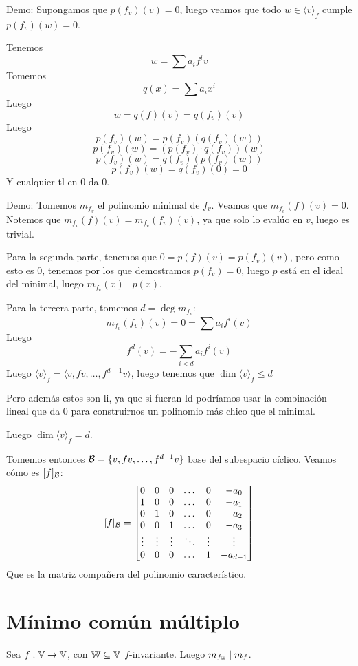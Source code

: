 \documentclass{article}
\begin{document}
Demo:
Supongamos que $p(f_v)(v) = 0$, luego veamos que todo $w \in \langle v \rangle_f$ cumple $p(f_v)(w) = 0$.

Tenemos
\[w = \sum a_i f^iv\]
Tomemos \[q(x) = \sum a_i x^i\]
Luego
\[
	w = q(f)(v) = q(f_v)(v)
\]
Luego
\[
	p(f_v)(w) = p(f_v)(q(f_v)(w))
\]
\[
	p(f_v)(w) = (p(f_v) \cdot q(f_v))(w)
\]
\[
	p(f_v)(w) = q(f_v)(p(f_v)(w))
\]
\[
	p(f_v)(w) = q(f_v)(0) = 0
\]
Y cualquier tl en $0$ da $0$.

Demo:
Tomemos $m_{f_v}$ el polinomio minimal de $f_v$. Veamos que $m_{f_v}(f)(v) = 0$. Notemos que $m_{f_v}(f)(v) = m_{f_v}(f_v)(v)$, ya que solo lo evalúo en $v$, luego es trivial.

Para la segunda parte, tenemos que $0 = p(f)(v) = p(f_v)(v)$, pero como esto es $0$, tenemos por los que demostramos $p(f_v) = 0$, luego $p$ está en el ideal del minimal, luego $m_{f_v}(x) \mid p(x)$.

Para la tercera parte, tomemos $d = \deg m_{f_v}$:
\[
	m_{f_v}(f_v)(v) = 0 = \sum a_if^i(v)
\]
Luego
\[
	f^d(v) = -\sum_{i < d} a_if^i(v)
\]
Luego $\langle v \rangle_f = \langle v, fv, \dots, f^{d-1}v \rangle$, luego tenemos que $\dim \langle v \rangle_f \leq d$

Pero además estos son li, ya que si fueran ld podríamos usar la combinación lineal que da $0$ para construirnos un polinomio más chico que el minimal.

Luego $\dim \langle v \rangle_f = d$.

Tomemos entonces $\mathcal{B} = \{v, fv, \dots, f^{d-1}v \}$ base del subespacio cíclico. Veamos cómo es $[f]_{\mathcal{B}}$:
\[
	[f]_{\mathcal{B}} = \begin{bmatrix}
		0 & 0 & 0&\dots & 0&-a_0 \\
		1 & 0 & 0&\dots & 0&-a_1 \\
		0 & 1 & 0&\dots & 0&-a_2 \\
		0 & 0 & 1&\dots & 0&-a_3 \\
		\vdots &
		\vdots &
		\vdots &
		\ddots &
		\vdots &
		\vdots \\
		0 & 0 & 0&\dots & 1&-a_{d-1} \\
	\end{bmatrix}
\]
Que es la matriz compañera del polinomio característico.

\section*{Mínimo común múltiplo}
Sea $f : \mathbb{V} \to \mathbb{V}$, con $\mathbb{W}\subseteq\mathbb{V}$ $f$-invariante. Luego $m_{f_{\mathbb{W}}} \mid m_f$.
\end{document}
